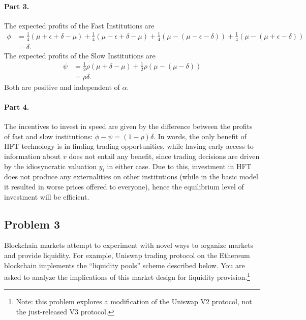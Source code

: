 \begin{solution}
	
	\paragraph{Part 3.}
	The expected profits of the Fast Institutions are
	\begin{align*}
		\phi &= \frac{1}{4} (\mu + \epsilon + \delta - \mu) + \frac{1}{4} (\mu - \epsilon + \delta - \mu) + \frac{1}{4} (\mu - (\mu - \epsilon - \delta)) + \frac{1}{4} (\mu - (\mu + \epsilon - \delta))
		\\
		&= \delta.
	\end{align*}
	The expected profits of the Slow Institutions are
	\begin{align*}
		\psi &= \frac{1}{2} \rho (\mu+\delta - \mu) + \frac{1}{2} \rho (\mu - (\mu - \delta))
		\\
		&= \rho \delta.
	\end{align*}
	Both are positive and independent of $\alpha$.
	
	
	\paragraph{Part 4.}
	The incentives to invest in speed are given by the difference between the profits of fast and slow institutions: $\phi - \psi = (1-\rho) \delta$. In words, the only benefit of HFT technology is in finding trading opportunities, while having early access to information about $v$ does not entail any benefit, since trading decisions are driven by the idiosyncratic valuation $y_i$ in either case. Due to this, investment in HFT does not produce any externalities on other institutions (while in the basic model it resulted in worse prices offered to everyone), hence the equilibrium level of investment will be efficient.
\end{solution}




\quad
\subsection*{Problem 3}
	Blockchain markets attempt to experiment with novel ways to organize markets and provide liquidity. For example, Uniswap trading protocol on the Ethereum blockchain implements the ``liquidity pools'' scheme described below. You are asked to analyze the implications of this market design for liquidity provision.\footnote{Note: this problem explores a modification of the Uniswap V2 protocol, not the just-released V3 protocol.}
	
